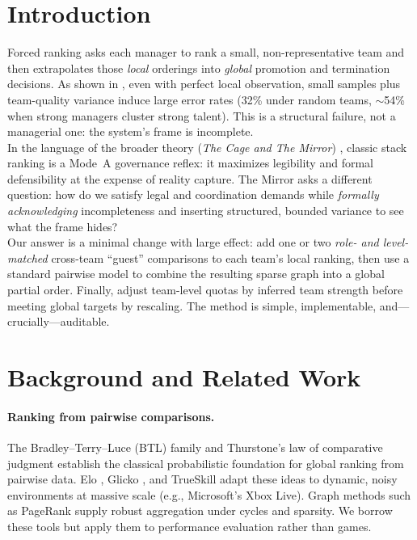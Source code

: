 \documentclass[11pt]{article}
\begin{document}
\section{Introduction}
Forced ranking asks each manager to rank a small, non-representative team and then extrapolates those \emph{local} orderings into \emph{global} promotion and termination decisions. As shown in \citep{jeremy2025-rank}, even with perfect local observation, small samples plus team-quality variance induce large error rates (32\% under random teams, $\sim$54\% when strong managers cluster strong talent). This is a structural failure, not a managerial one: the system's frame is incomplete.\\

\noindent
In the language of the broader theory (\emph{The Cage and The Mirror}) \citep{jeremy2025-cage,jeremy2025-mirror}, classic stack ranking is a Mode~A governance reflex: it maximizes legibility and formal defensibility at the expense of reality capture. The Mirror asks a different question: how do we satisfy legal and coordination demands while \emph{formally acknowledging} incompleteness and inserting structured, bounded variance to see what the frame hides?\\

\noindent
Our answer is a minimal change with large effect: add one or two \emph{role- and level-matched} cross-team ``guest'' comparisons to each team's local ranking, then use a standard pairwise model to combine the resulting sparse graph into a global partial order. Finally, adjust team-level quotas by inferred team strength before meeting global targets by rescaling. The method is simple, implementable, and---crucially---auditable.

\section{Background and Related Work}
\paragraph{Ranking from pairwise comparisons.} The Bradley--Terry--Luce (BTL) family \citep{bradley1952,luce1959} and Thurstone's law of comparative judgment \citep{thurstone1927} establish the classical probabilistic foundation for global ranking from pairwise data. Elo \citep{elo1978}, Glicko \citep{glickman1999}, and TrueSkill \citep{herbrich2007trueskill} adapt these ideas to dynamic, noisy environments at massive scale (e.g., Microsoft's Xbox Live). Graph methods such as PageRank \citep{page1999pagerank} supply robust aggregation under cycles and sparsity. We borrow these tools but apply them to performance evaluation rather than games.\\
\end{document}
